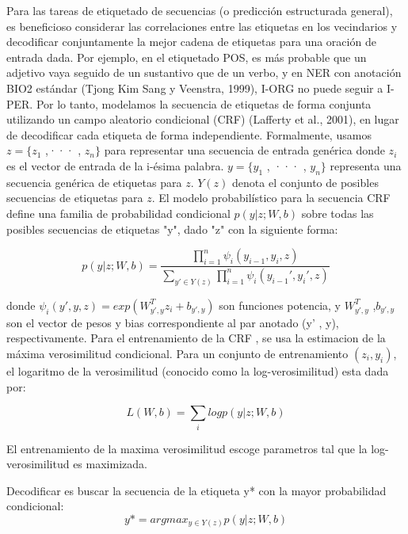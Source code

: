 \documentclass[runningheads]{llncs}
\begin{document}
Para las tareas de etiquetado de secuencias (o predicción estructurada general), es beneficioso 
considerar las correlaciones entre las etiquetas en los vecindarios y decodificar conjuntamente 
la mejor cadena de etiquetas para una oración de entrada dada. Por ejemplo, en el etiquetado POS, 
es más probable que un adjetivo vaya seguido de un sustantivo que de un verbo, y en NER con anotación 
BIO2 estándar (Tjong Kim Sang y Veenstra, 1999), I-ORG no puede seguir a I-PER. Por lo tanto, 
modelamos la secuencia de etiquetas de forma conjunta utilizando un campo aleatorio condicional 
(CRF) (Lafferty et al., 2001), en lugar de decodificar cada etiqueta de forma independiente. 
Formalmente, usamos $z = \{z_{1}$ ,··· , $z_{n} \}$ para representar una secuencia de entrada 
genérica donde $z_{i}$ es el vector de entrada de la i-ésima palabra. $y = \{y_{1}$ , ··· , $y_n \}$ 
representa una secuencia genérica de etiquetas para $z$. $Y(z)$ denota el conjunto de posibles 
secuencias de etiquetas para $z$. El modelo probabilístico para la secuencia CRF define una 
familia de probabilidad condicional $p(y|z; W, b)$ sobre todas las posibles secuencias de 
etiquetas "y", dado "z" con la siguiente forma:

\begin{equation}
	p(y|z; W, b) =  \frac {\prod_{i=1}^{n} \psi_{i} (y_{i−1}, y_{i} ,z)}
	{\sum_{y' \in Y(z)} \prod_{i=1}^{n} \psi_{i} (y_{i-1}', y_{i}' , z)}
\end{equation}


donde $\psi_{i}(y',y, z) = exp(W_{y',y}^{T} z_{i}+ b_{y',y} )$ son funciones potencia, 
y $W_{y',y}^{T}$ ,$b_{y',y}$  son  el vector de pesos y bias correspondiente al par anotado 
(y' , y), respectivamente. Para el entrenamiento de la CRF , se usa la estimacion de la máxima 
verosimilitud condicional. Para un conjunto de entrenamiento ${(z_{i} , y_{i} )}$, el 
logaritmo de la verosimilitud (conocido como la log-verosimilitud) esta dada por:

\begin{equation}
	L(W, b) =\sum_{i}{log p(y|z; W, b)}
\end{equation}



El entrenamiento de la maxima verosimilitud escoge parametros tal que la log-verosimilitud 
es maximizada.

Decodificar es buscar la secuencia de la etiqueta y* con la mayor probabilidad condicional:
\begin{equation}
	y\ast = argmax_{y\in Y(z)} p(y|z; W, b)
\end{equation}
\end{document}
